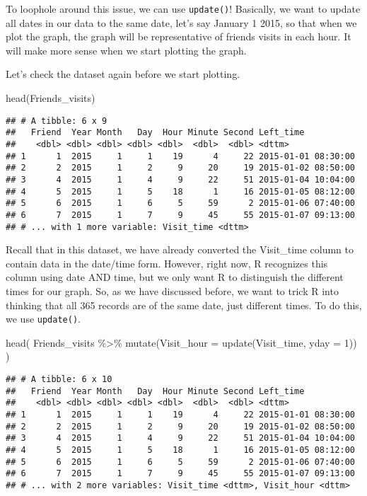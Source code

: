 \documentclass[
]{book}
\newenvironment{Shaded}{\begin{snugshade}}{\end{snugshade}}
\newcommand{\AttributeTok}[1]{\textcolor[rgb]{0.77,0.63,0.00}{#1}}
\newcommand{\DecValTok}[1]{\textcolor[rgb]{0.00,0.00,0.81}{#1}}
\newcommand{\FunctionTok}[1]{\textcolor[rgb]{0.00,0.00,0.00}{#1}}
\newcommand{\NormalTok}[1]{#1}
\newcommand{\SpecialCharTok}[1]{\textcolor[rgb]{0.00,0.00,0.00}{#1}}
\begin{document}
To loophole around this issue, we can use \texttt{update()}! Basically, we want to update all dates in our data to the same date, let's say January 1 2015, so that when we plot the graph, the graph will be representative of friends visits in each hour. It will make more sense when we start plotting the graph.

Let's check the dataset again before we start plotting.

\begin{Shaded}
\begin{Highlighting}[]
\FunctionTok{head}\NormalTok{(Friends\_visits)}
\end{Highlighting}
\end{Shaded}

\begin{verbatim}
## # A tibble: 6 x 9
##   Friend  Year Month   Day  Hour Minute Second Left_time          
##    <dbl> <dbl> <dbl> <dbl> <dbl>  <dbl>  <dbl> <dttm>             
## 1      1  2015     1     1    19      4     22 2015-01-01 08:30:00
## 2      2  2015     1     2     9     20     19 2015-01-02 08:50:00
## 3      4  2015     1     4     9     22     51 2015-01-04 10:04:00
## 4      5  2015     1     5    18      1     16 2015-01-05 08:12:00
## 5      6  2015     1     6     5     59      2 2015-01-06 07:40:00
## 6      7  2015     1     7     9     45     55 2015-01-07 09:13:00
## # ... with 1 more variable: Visit_time <dttm>
\end{verbatim}

Recall that in this dataset, we have already converted the Visit\_time column to contain data in the date/time form. However, right now, R recognizes this column using date AND time, but we only want R to distinguish the different times for our graph. So, as we have discussed before, we want to trick R into thinking that all 365 records are of the same date, just different times. To do this, we use \texttt{update()}.

\begin{Shaded}
\begin{Highlighting}[]
\FunctionTok{head}\NormalTok{(}
\NormalTok{    Friends\_visits }\SpecialCharTok{\%\textgreater{}\%}
    \FunctionTok{mutate}\NormalTok{(}\AttributeTok{Visit\_hour =} \FunctionTok{update}\NormalTok{(Visit\_time, }\AttributeTok{yday =} \DecValTok{1}\NormalTok{))}
\NormalTok{    )}
\end{Highlighting}
\end{Shaded}

\begin{verbatim}
## # A tibble: 6 x 10
##   Friend  Year Month   Day  Hour Minute Second Left_time          
##    <dbl> <dbl> <dbl> <dbl> <dbl>  <dbl>  <dbl> <dttm>             
## 1      1  2015     1     1    19      4     22 2015-01-01 08:30:00
## 2      2  2015     1     2     9     20     19 2015-01-02 08:50:00
## 3      4  2015     1     4     9     22     51 2015-01-04 10:04:00
## 4      5  2015     1     5    18      1     16 2015-01-05 08:12:00
## 5      6  2015     1     6     5     59      2 2015-01-06 07:40:00
## 6      7  2015     1     7     9     45     55 2015-01-07 09:13:00
## # ... with 2 more variables: Visit_time <dttm>, Visit_hour <dttm>
\end{verbatim}
\end{document}
